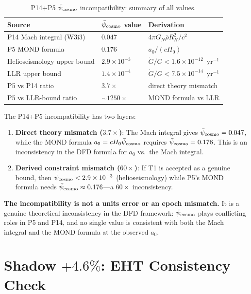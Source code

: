 \documentclass[11pt]{article}
\newcommand{\ee}[1]{\times 10^{#1}}
\newcommand{\psicosmo}{\bar{\psi}_{\rm cosmo}}
\begin{document}
\begin{table}[h]
\centering
\caption{P14+P5 $\psicosmo$ incompatibility: summary of all values.}
\label{tab:psi-values}
\begin{tabular}{lll}
\toprule
\textbf{Source} & \textbf{$\psicosmo$ value} & \textbf{Derivation} \\
\midrule
P14 Mach integral (W3i3) & $0.047$ & $4\pi G_N\bar{\rho}R_H^2/c^2$ \\
P5 MOND formula & $0.176$ & $a_0/(cH_0)$ \\
Helioseismology upper bound & $2.9\ee{-3}$ & $\dot{G}/G < 1.6\ee{-12}$~yr$^{-1}$ \\
LLR upper bound & $1.4\ee{-4}$ & $\dot{G}/G < 7.5\ee{-14}$~yr$^{-1}$ \\
\midrule
P5 vs P14 ratio & $3.7\times$ & direct theory mismatch \\
P5 vs LLR-bound ratio & $\sim 1250\times$ & MOND formula vs LLR \\
\bottomrule
\end{tabular}
\end{table}

\begin{tcolorbox}[colback=red!5!white, colframe=red!60!black,
  title=\textbf{P14+P5 Incompatibility: Source Identified}]
The P14+P5 incompatibility has two layers:
\begin{enumerate}
\item \textbf{Direct theory mismatch ($3.7\times$)}: The Mach integral gives
  $\psicosmo = 0.047$, while the MOND formula $a_0 = cH_0\psicosmo$ requires
  $\psicosmo = 0.176$. This is an inconsistency in the DFD formula for $a_0$
  vs.\ the Mach integral.
\item \textbf{Derived constraint mismatch ($60\times$)}: If T1 is accepted as
  a genuine bound, then $\psicosmo < 2.9\ee{-3}$ (helioseismology) while P5's
  MOND formula needs $\psicosmo \approx 0.176$---a $60\times$ inconsistency.
\end{enumerate}
\textbf{The incompatibility is not a units error or an epoch mismatch.}
It is a genuine theoretical inconsistency in the DFD framework: $\psicosmo$
plays conflicting roles in P5 and P14, and no single value is consistent
with both the Mach integral and the MOND formula at the observed $a_0$.
\end{tcolorbox}

\section{Shadow $+4.6\%$: EHT Consistency Check}
\label{sec:shadow}
\end{document}
